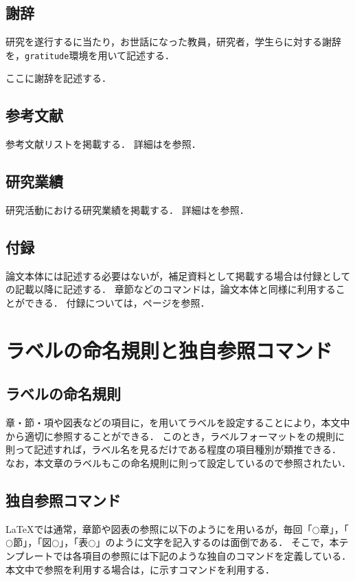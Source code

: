 \documentclass[a4j,11pt]{ujreport}
\begin{document}
\subsection{謝辞}
研究を遂行するに当たり，お世話になった教員，研究者，学生らに対する謝辞を，\texttt{gratitude}環境を用いて記述する．

\begin{code}
\begin{gratitude}
ここに謝辞を記述する．
\end{gratitude}
\end{code}%

\subsection{参考文献}
参考文献リストを掲載する．
詳細はを参照．

\subsection{研究業績}
研究活動における研究業績を掲載する．
詳細はを参照．

\subsection{付録}
論文本体には記述する必要はないが，補足資料として掲載する場合は付録としての記載以降に記述する．
章節などのコマンドは，論文本体と同様に利用することができる．
付録については，\pageref{apdx:Example}ページを参照．

\section{ラベルの命名規則と独自参照コマンド}

\subsection{ラベルの命名規則}
章・節・項や図表などの項目に，を用いてラベルを設定することにより，本文中から適切に参照することができる．
このとき，ラベルフォーマットをの規則に則って記述すれば，ラベル名を見るだけである程度の項目種別が類推できる．
なお，本文章のラベルもこの命名規則に則って設定しているので参照されたい．

\subsection{独自参照コマンド}
{\LaTeX}では通常，章節や図表の参照に以下のようにを用いるが，毎回「$\bigcirc$章」，「$\bigcirc$節」，「図$\bigcirc$」，「表$\bigcirc$」のように文字を記入するのは面倒である．
そこで，本テンプレートでは各項目の参照には下記のような独自のコマンドを定義している．
本文中で参照を利用する場合は，に示すコマンドを利用する．
\end{document}
